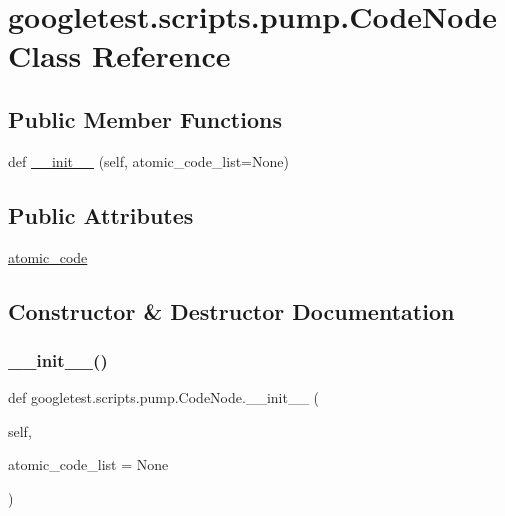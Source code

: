 \hypertarget{classgoogletest_1_1scripts_1_1pump_1_1_code_node}{}\section{googletest.\+scripts.\+pump.\+Code\+Node Class Reference}
\label{classgoogletest_1_1scripts_1_1pump_1_1_code_node}
\subsection*{Public Member Functions}
\begin{DoxyCompactItemize}
\item 
def \mbox{\hyperlink{classgoogletest_1_1scripts_1_1pump_1_1_code_node_a05bcc89b060fc8aa11251ab767361075}{\+\_\+\+\_\+init\+\_\+\+\_\+}} (self, atomic\+\_\+code\+\_\+list=None)
\end{DoxyCompactItemize}
\subsection*{Public Attributes}
\begin{DoxyCompactItemize}
\item 
\mbox{\hyperlink{classgoogletest_1_1scripts_1_1pump_1_1_code_node_ae148adbd428fa1f4ea7c8a522e9718ab}{atomic\+\_\+code}}
\end{DoxyCompactItemize}


\subsection{Constructor \& Destructor Documentation}
\mbox{\label{classgoogletest_1_1scripts_1_1pump_1_1_code_node_a05bcc89b060fc8aa11251ab767361075}} 
\subsubsection{\texorpdfstring{\_\_init\_\_()}{\_\_init\_\_()}}
{\footnotesize\ttfamily def googletest.\+scripts.\+pump.\+Code\+Node.\+\_\+\+\_\+init\+\_\+\+\_\+ (\begin{DoxyParamCaption}\item[{}]{self,  }\item[{}]{atomic\+\_\+code\+\_\+list = {\ttfamily None} }\end{DoxyParamCaption})}



